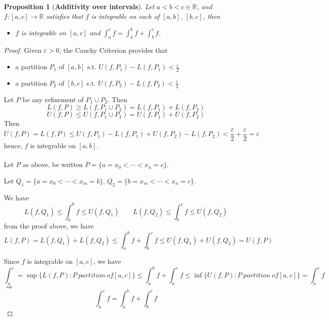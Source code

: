 \documentclass[12pt]{article}
\theoremstyle{plain}
\newtheorem{proposition}{Proposition}[subsection]
\newcommand{\ep}{\varepsilon}
\begin{document}
	\begin{proposition}[\textbf{Additivity over intervals}]
		Let $a<b<c \in \mathbb{R}$, and $f:[a,c] \to \mathbb{R}$ satisfies
		that $f$ is integrable on each of $[a,b]$, $[b,c]$, then 
		\begin{itemize}
			\item $f$ is integrable on $[a,c]$ and  
				$\int_a^c f = \int_a^b f+\int_b^c f$.
						\end{itemize}
	\end{proposition}
	\begin{proof}
		Given $\ep > 0$, the Cauchy Criterion provides that 
		\begin{itemize}
			\item a partition $P_1$ of $[a,b]$ s.t. 
				$U(f,P_1) - L(f,P_1) < \frac{\ep}2$
			\item a partition $P_2$ of $[b,c]$ s.t. 
				$U(f,P_2) - L(f,P_2) < \frac{\ep}2$
		\end{itemize}
		Let $P$ be any refinement of $P_1\cup P_2$. Then 
		\[
			L(f,P)\geq L(f,P_1\cup P_2) = L(f,P_1) + L(f,P_2)
		\]
		\[
			U(f,P)\leq U(f,P_1\cup P_2) = U(f,P_1) + U(f,P_2)
		\]
		Then
		\[
			U(f,P)=L(f,P) \leq U(f,P_1) - L(f,P_1) +U(f,P_2) - L(f,P_2)
			<\frac{\ep}2+\frac{\ep}2 = \ep
		\]
		hence, $f$ is integrable on $[a,b]$. \\\\

		Let $P$ as above, be written $P = \{a = x_0 < \cdots < x_n = c\}$.
		
		Let $Q_1 = \{a=x_0<\cdots<x_m = b\}$, $Q_2 = \{b = x_m <\cdots<x_n=c\}$.
		
		We have 
		\[
			L(f,Q_1) \leq \int_a^b f \leq U(f,Q_1) \qquad 
			L(f,Q_2) \leq \int_b^c f \leq U(f,Q_2)
		\]
		from the proof above, we have 
		\[
			L(f,P) = L(f,Q_1)+L(f,Q_2)\leq \int_a^b f + \int_b^c f
			\leq U(f,Q_1) + U(f,Q_2) = U(f,P)
		\]
	
		Since $f$ is integrable on $[a,c]$, we have
		\[
			\int_a^c = \sup\{L(f,P):P \ partition \ of [a,c] \}
			\leq \int_a^b f + \int_a^c f \leq \inf\{U(f,P): P\ partition
			\ of [a,c]\} = \int_a^c f
		\]
		$\Rightarrow$
		\[
			\int_a^c f = \int_a^b f + \int_b^c f
		\]
	\end{proof}

\end{document}
